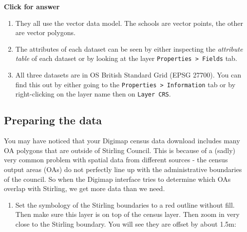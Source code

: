 \documentclass[
  letterpaper,
  DIV=11,
  numbers=noendperiod]{scrreprt}
\providecommand{\tightlist}{%
  \setlength{\itemsep}{0pt}\setlength{\parskip}{0pt}}\usepackage{longtable,booktabs,array}
\begin{document}
\begin{tcolorbox}[enhanced jigsaw, toprule=.15mm, breakable, left=2mm, colframe=quarto-callout-important-color-frame, colback=white, arc=.35mm, leftrule=.75mm, opacityback=0, rightrule=.15mm, bottomrule=.15mm]

\vspace{-3mm}\textbf{Click for answer}\vspace{3mm}

\begin{enumerate}
\def\labelenumi{\arabic{enumi}.}
\item
  They all use the vector data model. The schools are vector points, the
  other are vector polygons.
\item
  The attributes of each dataset can be seen by either inspecting the
  \emph{attribute table} of each dataset or by looking at the layer
  \texttt{Properties\ \textgreater{}\ Fields} tab.
\item
  All three datasets are in OS British Standard Grid (EPSG 27700). You
  can find this out by either going to the
  \texttt{Properties\ \textgreater{}\ Information} tab or by
  right-clicking on the layer name then on \texttt{Layer\ CRS}.\\
\end{enumerate}

\end{tcolorbox}

\subsection{Preparing the data}\label{preparing-the-data}

You may have noticed that your Digimap census data download includes
many OA polygons that are outside of Stirling Council. This is because
of a (sadly) very common problem with spatial data from different
sources - the census output areas (OAs) do not perfectly line up with
the administrative boundaries of the council. So when the Digimap
interface tries to determine which OAs overlap with Stirling, we get
more data than we need.

\begin{enumerate}
\def\labelenumi{(\arabic{enumi})}
\setcounter{enumi}{282}
\tightlist
\item
  Set the symbology of the Stirling boundaries to a red outline without
  fill. Then make sure this layer is on top of the census layer. Then
  zoom in very close to the Stirling boundary. You will see they are
  offset by about 1.5m:
\end{enumerate}
\end{document}
